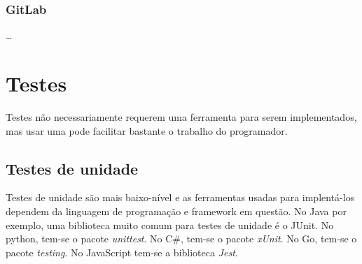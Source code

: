 \subsubsection*{GitLab}
\dots








\section{Testes}
Testes não necessariamente requerem uma ferramenta para serem implementados, mas usar uma pode facilitar bastante o trabalho do programador.

\subsection{Testes de unidade}
Testes de unidade são mais baixo-nível e as ferramentas usadas para implentá-los dependem da linguagem de programação e framework em questão. No Java por exemplo, uma biblioteca muito comum para testes de unidade é o JUnit. No python, tem-se o pacote \emph{unittest}. No C\#, tem-se o pacote \emph{xUnit}. No Go, tem-se o pacote \emph{testing}. No JavaScript tem-se a biblioteca \emph{Jest}.

